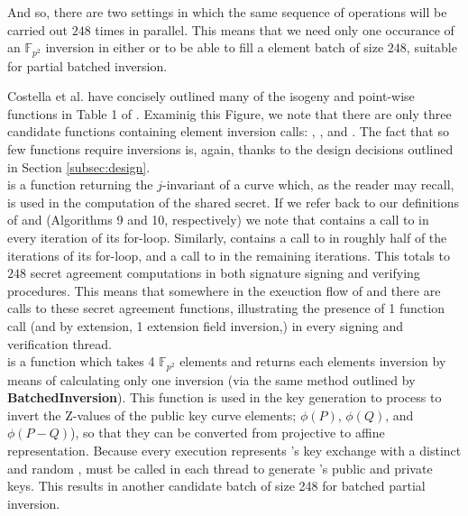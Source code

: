 And so, there are two settings in which the same sequence of operations will be carried out $248$ times in parallel. This means that we need only one occurance of an $\mathbb{F}_{p^2}$ inversion in either  or  to be able to fill a element batch of size $248$, suitable for partial batched inversion. 

Costella et al. have concisely outlined many of the \sidh isogeny and point-wise functions in Table 1 of \cite{effalg}. Examinig this Figure, we note that there are only three candidate functions containing element inversion calls: , , and . The fact that so few functions require inversions is, again, thanks to the design decisions outlined in Section \ref{subsec:design}.\\

\noindent
{} is a function returning the $j$-invariant of a curve which, as the reader may recall, is used in the computation of the shared secret. If we refer back to our definitions of  and  (Algorithms 9 and 10, respectively) we note that  contains a call to  in every iteration of its for-loop. Similarly,  contains a call to  in roughly half of the iterations of its for-loop, and a call to  in the remaining iterations. This totals to $248$ secret agreement computations in both signature signing and verifying procedures. This means that somewhere in the exeuction flow of  and  there are calls to these secret agreement functions, illustrating the presence of 1  function call (and by extension, 1 extension field inversion,) in every signing and verification thread.\\

\noindent
{} is a function which takes 4 $\mathbb{F}_{p^2}$ elements and returns each elements inversion by means of calculating only one inversion (via the same method outlined by \textbf{BatchedInversion}). This function is used in the key generation to process to invert the Z-values of the public key curve elements; $\phi(P)$, $\phi(Q)$, and $\phi(P-Q)$), so that they can be converted from projective to affine representation. Because every  execution represents \bob's key exchange with a distinct and random \randall,  must be called in each thread to generate \randall's public and private keys. This results in another candidate batch of size 248 for batched partial inversion.\\

